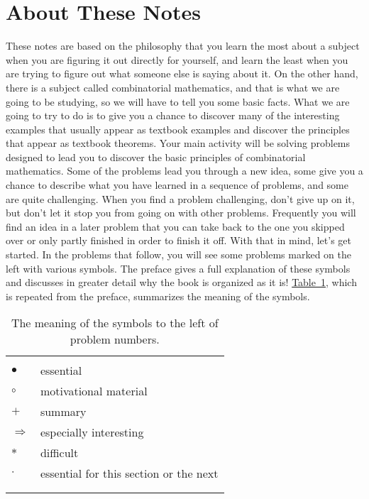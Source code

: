 \documentclass[10pt,]{book}
\theoremstyle{plain}
\theoremstyle{definition}
\theoremstyle{definition}
\numberwithin{equation}{chapter}
\newcommand{\hrulethin}  {\noalign{\hrule height 0.04em}}
\newcommand{\importantarrow}{$\Rightarrow$}
\begin{document}
\section[{About These Notes}]{About These Notes}\label{section-1}
These notes are based on the philosophy that you learn the most about a subject when you are figuring it out directly for yourself, and learn the least when you are trying to figure out what someone else is saying about it. On the other hand, there is a subject called combinatorial mathematics, and that is what we are going to be studying, so we will have to tell you some basic facts. What we are going to try to do is to give you a chance to discover many of the interesting examples that usually appear as textbook examples and discover the principles that appear as textbook theorems. Your main activity will be solving problems designed to lead you to discover the basic principles of combinatorial mathematics. Some of the problems lead you through a new idea, some give you a chance to describe what you have learned in a sequence of problems, and some are quite challenging. When you find a problem challenging, don't give up on it, but don't let it stop you from going on with other problems. Frequently you will find an idea in a later problem that you can take back to the one you skipped over or only partly finished in order to finish it off. With that in mind, let's get started. In the problems that follow, you will see some problems marked on the left with various symbols. The preface gives a full explanation of these symbols and discusses in greater detail why the book is organized as it is! \hyperref[tab_prob-symbs]{Table~\ref{tab_prob-symbs}}, which is repeated from the preface, summarizes the meaning of the symbols.%
\begin{table}
\centering
\begin{tabular}{ll}
&\tabularnewline\hrulethin
\(\bullet\)&essential\tabularnewline[0pt]
\(\circ\)&motivational material\tabularnewline[0pt]
\(+\)&summary\tabularnewline[0pt]
\importantarrow&especially interesting\tabularnewline[0pt]
\(*\)&difficult\tabularnewline[0pt]
\(\cdot\)&essential for this section or the next\tabularnewline[0pt]
&\tabularnewline\hrulethin
\end{tabular}
\caption{The meaning of the symbols to the left of problem numbers.\label{tab_prob-symbs}}
\end{table}
\typeout{************************************************}
\typeout{************************************************}
\end{document}
